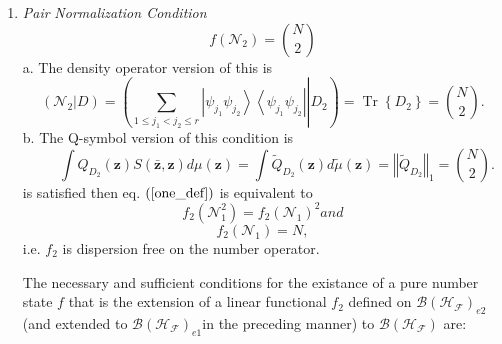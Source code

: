 \documentclass[aps,preprint]{revtex4}%
\begin{document}
\begin{enumerate}
\item[1] \emph{Pair} \emph{Normalization Condition}%
\begin{equation}
f\left(  \mathcal{N}_{2}\right)  =\binom{N}{2}%
\end{equation}
a. The density operator version of this is
\begin{equation}
\left(  \left.  \mathcal{N}_{2}\right\vert D\right)  =\left(  \left.
\sum_{1\leq j_{1}<j_{2}\leq r}\left\vert \psi_{j_{1}}\psi_{j_{2}}\right\rangle
\left\langle \psi_{j_{1}}\psi_{j_{2}}\right\vert \right\vert D_{2}\right)
=\operatorname*{Tr}\left\{  D_{2}\right\}  =\binom{N}{2}.
\end{equation}
b. The Q-symbol version of this condition is
\begin{equation}
\qquad\int Q_{D_{2}}\left(  \mathbf{z}\right)  S\left(  \mathbf{\bar{z}%
,z}\right)  d\mu\left(  \mathbf{z}\right)  =\int\tilde{Q}_{D_{2}}\left(
\mathbf{z}\right)  d\tilde{\mu}\left(  \mathbf{z}\right)  =\left\Vert
\tilde{Q}_{D_{2}}\right\Vert _{1}=\binom{N}{2}.
\end{equation}
is satisfied then eq. $\left(  \ref{one_def}\right)  $ is equivalent to
\begin{subequations}
\begin{equation}
f_{2}\left(  \mathcal{N}_{1}^{2}\right)  =f_{2}\left(  \mathcal{N}_{1}\right)
^{2}%
\end{equation}
and
\end{subequations}
\begin{equation}
f_{2}\left(  \mathcal{N}_{1}\right)  =N,
\end{equation}
i.e. $f_{2}$ is dispersion free on the number operator.

The necessary and sufficient conditions for the existance of a pure number
state $f$ that is the extension of a linear functional $f_{2}$ defined on
$\mathcal{B}\left(  \mathcal{H}_{\mathcal{F}}\right)  _{e2}$ (and extended to
$\mathcal{B}\left(  \mathcal{H}_{\mathcal{F}}\right)  _{e1}$in the preceding
manner) to $\mathcal{B}\left(  \mathcal{H}_{\mathcal{F}}\right)  $ are:


\end{enumerate}
\end{document}
